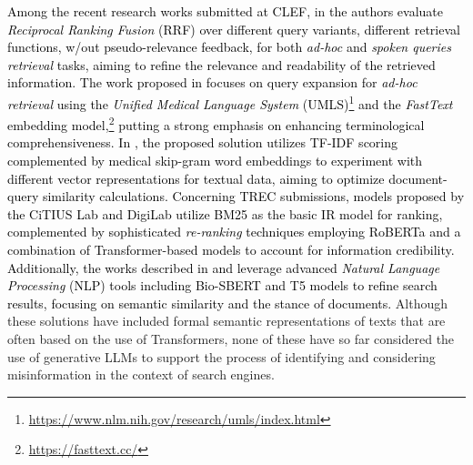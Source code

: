 \textcolor{black}{%
Among the recent research works submitted at CLEF,} in \textcolor{black}{\citep{di2020study} the authors evaluate \textit{Reciprocal Ranking Fusion} (RRF) \cite{cormack2009reciprocal} over different query variants, different retrieval functions, w/out
pseudo-relevance feedback, for both \textit{ad-hoc} and \textit{spoken queries retrieval} tasks, aiming to refine the relevance and readability of the retrieved information. The work proposed in \citep{mulhem2020lig} focuses on query expansion for \textit{ad-hoc retrieval} using the \textit{Unified Medical Language System} (UMLS)\footnote{\url{https://www.nlm.nih.gov/research/umls/index.html}} and the \textit{FastText} embedding model,\footnote{\url{https://fasttext.cc/}} putting a strong emphasis on enhancing terminological comprehensiveness. In \citep{seneviratne2020sandidoc}, the proposed solution utilizes TF-IDF scoring complemented by medical skip-gram word embeddings to experiment with different vector representations for textual data, aiming to optimize document-query similarity calculations. Concerning TREC submissions, %
models proposed by the CiTIUS Lab \citep{fernandez2020citius} and DigiLab \citep{zhang2022ds4dh} utilize BM25 as the basic IR model for ranking, complemented by sophisticated \textit{re-ranking} techniques employing RoBERTa and a combination of Transformer-based models to account for information credibility. Additionally, the works described in \citep{schlicht2021upv} and \citep{abualsaud2021uwaterloomds} leverage advanced \textit{Natural Language Processing} (NLP) tools including Bio-SBERT \citep{pankaj2022augmented} and T5 \citep{raffel2020exploring} models to refine search results, focusing on semantic similarity and the stance of documents.} Although these solutions have included formal semantic representations of texts that are often based on the use of Transformers, none of these have so far considered the use of generative LLMs to support the process of identifying and considering misinformation in the context of search engines.

